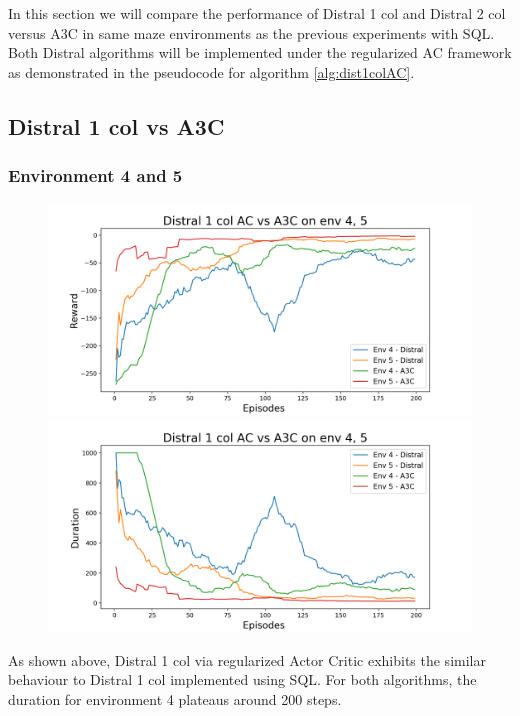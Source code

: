 \documentclass[12pt]{report}
\begin{document}
In this section we will compare the performance of Distral 1 col and Distral 2 col versus A3C in same maze environments as the previous experiments with SQL. Both Distral algorithms will be implemented under the regularized AC framework as demonstrated in the pseudocode for algorithm \ref{alg:dist1colAC}.

\subsection{Distral 1 col vs A3C}
\subsubsection{Environment 4 and 5}
\begin{figure}[H]
\centering
\begin{minipage}{.5\textwidth}
\centering
\includegraphics[width=\textwidth]{figs/d1_col_ac/d1_col_ac_4_5_rwd.png}
\end{minipage}%
\centering
\begin{minipage}{.5\textwidth}
\centering
\includegraphics[width=\textwidth]{figs/d1_col_ac/d1_col_ac_4_5_dur.png}
\end{minipage}%
\end{figure}
As shown above, Distral 1 col via regularized Actor Critic exhibits the similar behaviour to Distral 1 col implemented using SQL. For both algorithms, the duration for environment 4 plateaus around 200 steps. 
\end{document}
